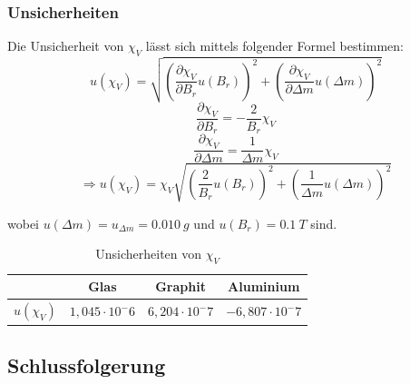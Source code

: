 \documentclass[
	a4paper,
	12pt,
	pagesize,
	ngerman
]{scrartcl}
\begin{document}
	\subsubsection*{Unsicherheiten}
	
	Die Unsicherheit von $\chi_V$ lässt sich mittels folgender Formel bestimmen:
	\begin{equation}
		u(\chi_V) = \sqrt{(\frac{\partial\chi_V}{\partial B_r}u(B_r))^2 + (\frac{\partial\chi_V}{\partial\Delta m}u(\Delta m))^2}
	\end{equation}
	\begin{equation}
		\frac{\partial\chi_V}{\partial B_r} =  -\frac{2}{B_r}\chi_V
	\end{equation}
	\begin{equation}
		\frac{\partial\chi_V}{\partial \Delta m} =  \frac{1}{\Delta m}\chi_V
	\end{equation}
	\begin{equation}
		\Rightarrow u(\chi_V) = \chi_V\sqrt{(\frac{2}{B_r}u(B_r))^2 + (\frac{1}{\Delta m}u(\Delta m))^2}
	\end{equation}
	
	wobei $u(\Delta m) =  u_{\Delta m} = \SI{0,010}{g}$ und $u(B_r) = \SI{0.1}{T}$ sind.
	
	\begin{table}[h]
		\centering
	\begin{tabular}{ r | c | c | c}
		& Glas & Graphit & Aluminium \\ \hline
		$u(\chi_V) $ &$1,045 \cdot 10^-6$&$6,204 \cdot 10^-7$&$-6,807 \cdot 10^-7$\\ \hline %
	\end{tabular} \newline
	\caption{Unsicherheiten von $ \chi_V $}
	\end{table}
	\subsection{Schlussfolgerung}
	
\end{document}
